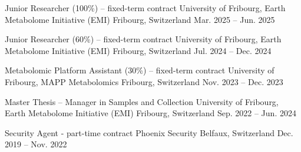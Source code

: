 

\begin{cventries}


\cventry
  {Junior Researcher (100\%) – fixed-term contract} %
  {University of Fribourg, Earth Metabolome Initiative (EMI)} %
  {Fribourg, Switzerland} %
  {Mar. 2025 -- Jun. 2025} %
  {}

\cventry
  {Junior Researcher (60\%) – fixed-term contract} %
  {University of Fribourg, Earth Metabolome Initiative (EMI)} %
  {Fribourg, Switzerland} %
  {Jul. 2024 -- Dec. 2024} %
  {}

\cventry
  {Metabolomic Platform Assistant (30\%) – fixed-term contract} %
  {University of Fribourg, MAPP Metabolomics} %
  {Fribourg, Switzerland} %
  {Nov. 2023 -- Dec. 2023} %
  {}

\cventry
  {Master Thesis – Manager in Samples and Collection} %
  {University of Fribourg, Earth Metabolome Initiative (EMI)} %
  {Fribourg, Switzerland} %
  {Sep. 2022 -- Jun. 2024} %
  {}

\cventry
  {Security Agent - part-time contract} %
  {Phoenix Security} %
  {Belfaux, Switzerland} %
  {Dec. 2019 -- Nov. 2022} %
  {}

\end{cventries}
